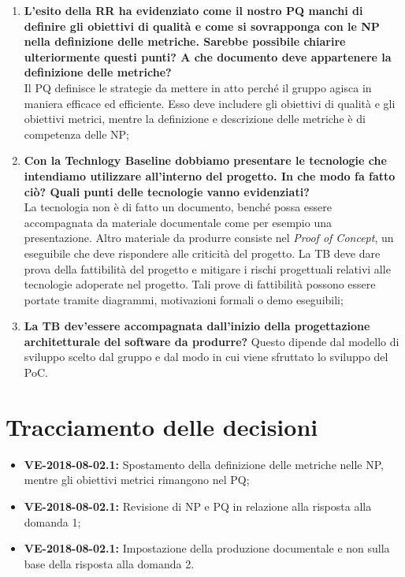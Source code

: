 \documentclass[openany,12pt,a4paper]{article}
\begin{document}
  \begin{enumerate}
  	\item \textbf{L'esito della RR ha evidenziato come il nostro PQ manchi di definire gli obiettivi di qualità e come si sovrapponga con le NP nella definizione delle metriche. Sarebbe possibile chiarire ulteriormente questi punti? A che documento deve appartenere la definizione delle metriche?} \\
  	Il PQ definisce le strategie da mettere in atto perché il gruppo agisca in maniera efficace ed efficiente. Esso deve includere gli obiettivi di qualità e gli obiettivi metrici, mentre la definizione e descrizione delle metriche è di competenza delle NP;
  	\item \textbf{Con la Technlogy Baseline dobbiamo presentare le tecnologie che intendiamo utilizzare all'interno del progetto. In che modo fa fatto ciò? Quali punti delle tecnologie vanno evidenziati?} \\
  	La tecnologia non è di fatto un documento, benché possa essere accompagnata da materiale documentale come per esempio una presentazione. Altro materiale da produrre consiste nel \textit{Proof of Concept}, un eseguibile che deve rispondere alle criticità del progetto. La TB deve dare prova della fattibilità del progetto e mitigare i rischi progettuali relativi alle tecnologie adoperate nel progetto. Tali prove di fattibilità possono essere portate tramite diagrammi, motivazioni formali o demo eseguibili;
  	\item \textbf{La TB dev'essere accompagnata dall'inizio della progettazione architetturale del software da produrre?}
  	Questo dipende dal modello di sviluppo scelto dal gruppo e dal modo in cui viene sfruttato lo sviluppo del PoC.
  \end{enumerate} 
 
  \section{Tracciamento delle decisioni} 
   
  \begin{itemize} 
      \item \textbf{VE-2018-08-02.1:} Spostamento della definizione delle metriche nelle NP, mentre gli obiettivi metrici rimangono nel PQ; 
      \item \textbf{VE-2018-08-02.1:} Revisione di NP e PQ in relazione alla risposta alla domanda 1;
      \item \textbf{VE-2018-08-02.1:} Impostazione della produzione documentale e non sulla base della risposta alla domanda 2.
  \end{itemize} 
   
  
\end{document}
